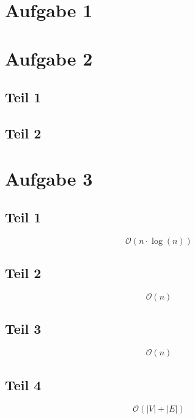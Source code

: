 \documentclass[10pt,a4paper]{article}
\begin{document}
\section{Aufgabe 1}

\section{Aufgabe 2}

\subsection{Teil 1}

\subsection{Teil 2}

\section{Aufgabe 3}

\subsection{Teil 1}

\begin{equation}
  \mathcal{O}(n \cdot \log(n))
\end{equation}

\subsection{Teil 2}

\begin{equation}
  \mathcal{O}(n)
\end{equation}

\subsection{Teil 3}

\begin{equation}
  \mathcal{O}(n)
\end{equation}

\subsection{Teil 4}

\begin{equation}
  \mathcal{O}(|V| + |E|)
\end{equation}
\end{document}
